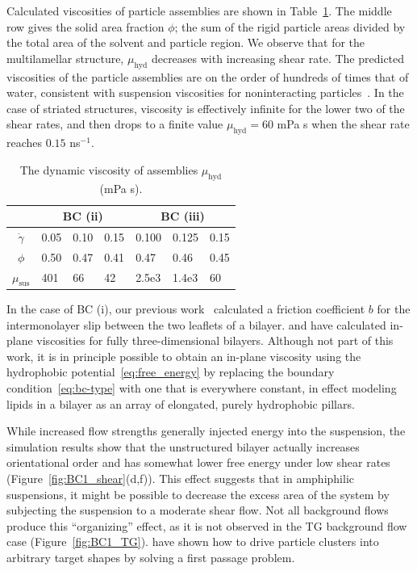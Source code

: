 \documentclass[prb,preprint,showpacs,preprintnumbers,amsmath,amssymb,longbibliography]{revtex4-1}
\begin{document}
Calculated viscosities of particle assemblies are shown in
Table~\ref{tbl:bcii_visc}. The middle row gives the solid area fraction
$\phi$; the sum of the rigid particle areas divided by the total area of
the solvent and particle region. We observe that for the multilamellar
structure, $\mu_{\text{hyd}}$ decreases with increasing shear rate. The
predicted viscosities of the particle assemblies are on the order of
hundreds of times that of water, consistent with suspension viscosities
for noninteracting particles~\cite{KONIJN201461}. In the case of
striated structures, viscosity is effectively infinite for the lower two
of the shear rates, and then drops to a finite value $\mu_{\text{hyd}} =
60$ mPa s when the shear rate reaches $0.15$ ns$^{-1}$.
\begin{table}
  \caption{\label{tbl:bcii_visc} The dynamic viscosity of assemblies
  $\mu_{\text{hyd}}$ (mPa s).}
\centering
\begin{tabularx}{0.7\textwidth}{c|X|X|X||X|X|X}
&\multicolumn{3}{c||}{BC (ii)} & \multicolumn{3}{c}{BC (iii)}\\
\hline
  $\dot \gamma$ & 0.05 & 0.10 \quad & 0.15 & 0.100 & 0.125 & 0.15\\
  \hline
  $\phi$ & 0.50 & 0.47 & 0.41 & 0.47 & 0.46 & 0.45 \\
  \hline
  $\mu_{\text{sus}} $ & 401 & 66 & 42 & 2.5e3 & 1.4e3 & 60\\
\hline
\end{tabularx}
\end{table}

In the case of BC (i), our previous work~\cite{Fu2022_JFM} calculated a
friction coefficient $b$ for the intermonolayer slip between the two
leaflets of a bilayer. \citet{denOtter2007,Zgorski2019} and
\citet{doi:10.1073/pnas.2100156118} have calculated in-plane viscosities
for fully three-dimensional bilayers. Although not part of this work, it
is in principle possible to obtain an in-plane viscosity using the
hydrophobic potential~\eqref{eq:free_energy} by replacing the boundary
condition~\eqref{eq:bc-type} with one that is everywhere constant, in
effect modeling lipids in a bilayer as an array of elongated, purely
hydrophobic pillars. 

While increased flow strengths generally injected energy into the
suspension, the simulation results show that the unstructured bilayer
actually increases orientational order and has somewhat lower free
energy under low shear rates (Figure~\ref{fig:BC1_shear}(d,f)). This
effect suggests that in amphiphilic suspensions, it might be possible to
decrease the excess area of the system by subjecting the suspension to a
moderate shear flow. Not all background flows produce this
``organizing'' effect, as it is not observed in the TG background flow
case (Figure~\ref{fig:BC1_TG}). \citet{PhysRevLett.128.256102} have
shown how to drive particle clusters into arbitrary target shapes by
solving a first passage problem.
\end{document}
